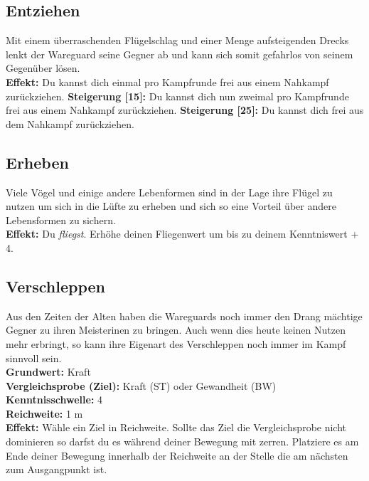 \subsection*{Entziehen} \label{sk:entziehen}
Mit einem überraschenden Flügelschlag und einer Menge aufsteigenden Drecks lenkt der Wareguard seine Gegner ab und kann sich somit gefahrlos von seinem Gegenüber lösen.\\
\textbf{Effekt:} Du kannst dich einmal pro Kampfrunde frei aus einem Nahkampf zurückziehen.
\textbf{Steigerung [15]:} Du kannst dich nun zweimal pro Kampfrunde frei aus einem Nahkampf zurückziehen.
\textbf{Steigerung [25]:} Du kannst dich frei aus dem Nahkampf zurückziehen.

\subsection*{Erheben} \label{sk:erheben}
Viele Vögel und einige andere Lebenformen sind in der Lage ihre Flügel zu nutzen um sich in die Lüfte zu erheben und sich so eine Vorteil über andere Lebensformen zu sichern.\\
\textbf{Effekt:} Du \textit{fliegst}. Erhöhe deinen Fliegenwert um bis zu deinem Kenntniswert + 4.

\subsection*{Verschleppen} \label{sk:verschleppen}
Aus den Zeiten der Alten haben die Wareguards noch immer den Drang mächtige Gegner zu ihren Meisterinen zu bringen. Auch wenn dies heute keinen Nutzen mehr erbringt, so kann ihre Eigenart des Verschleppen noch immer im Kampf sinnvoll sein.\\
\textbf{Grundwert:} Kraft \\
\textbf{Vergleichsprobe (Ziel):} Kraft (ST) oder Gewandheit (BW)
\textbf{Kenntnisschwelle:} 4 \\
\textbf{Reichweite:} 1 m \\
\textbf{Effekt:} Wähle ein Ziel in Reichweite. Sollte das Ziel die Vergleichsprobe nicht dominieren so darfst du es während deiner Bewegung mit zerren. Platziere es am Ende deiner Bewegung innerhalb der Reichweite an der Stelle die am nächsten zum Ausgangpunkt ist.